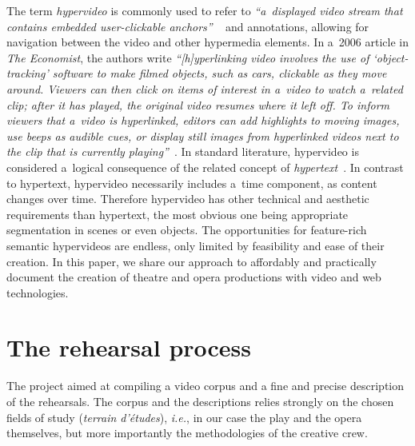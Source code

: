 \documentclass[conference]{IEEEtran}
\begin{document}
The term \emph{hypervideo} is commonly used to refer to
\textit{``a~displayed video stream that contains embedded user-clickable anchors''}%
~\cite{sawhney1996hypercafe,smith2002extensible}
and annotations, allowing for navigation between the video and other hypermedia elements.
In a~2006 article in \emph{The Economist}, the authors write 
\textit{``[h]yperlinking video involves the use of `object-tracking' software
to make filmed objects, such as cars, clickable as they move around.
Viewers can then click on items of interest in a~video
to watch a~related clip; after it has played,
the original video resumes where it left off.
To inform viewers that a~video is hyperlinked,
editors can add highlights to moving images, use beeps as audible cues,
or display still images from hyperlinked videos
next to the clip that is currently playing''}~\cite{economist2006hypervideo}.
In standard literature, hypervideo is considered a~logical consequence
of the related concept of \emph{hypertext}~\cite{bernerslee1990hypertext}.
In contrast to hypertext, hypervideo necessarily includes a~time component,
as content changes over time.
Therefore hypervideo has other technical and aesthetic requirements
than hypertext, the most obvious one being appropriate segmentation in scenes
or even objects.
The opportunities for feature-rich semantic hypervideos are endless,
only limited by feasibility and ease of their creation.
In this paper, we share our approach to affordably and practically document
the creation of theatre and opera productions with video and web technologies.


\section{The rehearsal process}



The project aimed at compiling a video corpus and a fine and precise description of the rehearsals. The corpus and the descriptions relies strongly on the chosen fields of study (\emph{terrain d'études}), \emph{i.e.}, in our case the play and the opera themselves, but more importantly the methodologies of the creative crew.
\end{document}
